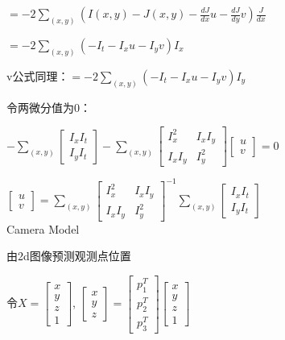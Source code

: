 \documentclass[UTF8]{ctexart}
\begin{document}
  \quad \quad \quad $ = -2\sum_{(x, y)}(I(x, y) - J(x, y) - \frac{dJ}{dx}u - \frac{dJ}{dy}v)\frac{J}{dx}$

  \quad \quad \quad $ = -2\sum_{(x, y)}(-I_t - I_xu - I_yv)I_x$

  \quad \quad \quad v公式同理：$ = -2\sum_{(x, y)}(-I_t - I_xu - I_yv)I_y$

  \quad \quad 令两微分值为0：

  \quad \quad \quad $-\sum_{(x, y)}
    \begin{bmatrix}
      I_xI_t \\
      I_yI_t
      \end{bmatrix} - \sum_{(x, y)}
    \begin{bmatrix}
      I_x^2 & I_xI_y \\
      I_xI_y & I_y^2
      \end{bmatrix}
    \begin{bmatrix}
      u \\
      v
      \end{bmatrix}
    = 0$

  \quad \quad \quad $
    \begin{bmatrix}
      u \\
      v
      \end{bmatrix}
    = 
    \sum_{(x, y)}
    \begin{bmatrix}
      I_x^2 & I_xI_y \\
      I_xI_y & I_y^2
      \end{bmatrix}^{-1}
    \sum_{(x, y)}
    \begin{bmatrix}
      I_xI_t \\
      I_yI_t
      \end{bmatrix}$\\
Camera Model 

  由2d图像预测观测点位置

  令$X = 
    \begin{bmatrix}
      x \\
      y \\
      z \\
      1
      \end{bmatrix}$, $
    \begin{bmatrix}
      x \\
      y \\
      z
      \end{bmatrix} 
    =
    \begin{bmatrix}
      p_1^T \\
      p_2^T \\
      p_3^T
      \end{bmatrix}
    \begin{bmatrix}
      x \\
      y \\
      z \\
      1
      \end{bmatrix}$
\end{document}
